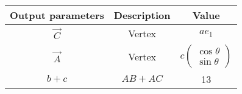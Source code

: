   \begin{tabular}{|c|c|c|}
    \hline
    \textbf{Output parameters}&\textbf{Description}&\textbf{Value}\\
    \hline
    $\Vec{C}$&Vertex&$ae_1$\\
    \hline
    $\Vec{A}$&Vertex&$c\begin{pmatrix}
        \cos{\theta}\\\sin{\theta}
    \end{pmatrix}$\\
    \hline
    $b+c$&$AB + AC$&13\\
    \hline
    \end{tabular}
